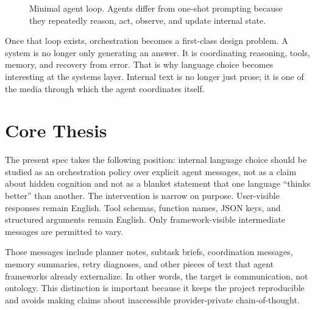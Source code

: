 \documentclass[11pt]{article}
\begin{document}
\begin{figure}[t]
\centering
{}
\caption{Minimal agent loop. Agents differ from one-shot prompting because they repeatedly reason, act, observe, and update internal state.}
\label{fig:agent-loop}
\end{figure}

Once that loop exists, orchestration becomes a first-class design problem. A system is no longer only generating an answer. It is coordinating reasoning, tools, memory, and recovery from error. That is why language choice becomes interesting at the systems layer. Internal text is no longer just prose; it is one of the media through which the agent coordinates itself.

\section{Core Thesis}

The present spec takes the following position: internal language choice should be studied as an orchestration policy over explicit agent messages, not as a claim about hidden cognition and not as a blanket statement that one language ``thinks better'' than another. The intervention is narrow on purpose. User-visible responses remain English. Tool schemas, function names, JSON keys, and structured arguments remain English. Only framework-visible intermediate messages are permitted to vary.

Those messages include planner notes, subtask briefs, coordination messages, memory summaries, retry diagnoses, and other pieces of text that agent frameworks already externalize. In other words, the target is communication, not ontology. This distinction is important because it keeps the project reproducible and avoids making claims about inaccessible provider-private chain-of-thought.
\end{document}
